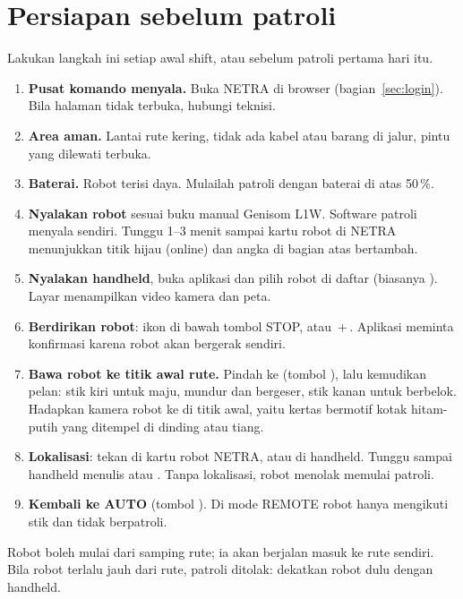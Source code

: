 \documentclass[11pt]{article}
\begin{document}
\section{Persiapan sebelum patroli}
\label{sec:prep}
Lakukan langkah ini setiap awal shift, atau sebelum patroli pertama hari itu.

\begin{enumerate}
  \item \textbf{Pusat komando menyala.} Buka NETRA di browser (bagian~\ref{sec:login}). Bila halaman
        tidak terbuka, hubungi teknisi.
  \item \textbf{Area aman.} Lantai rute kering, tidak ada kabel atau barang di jalur, pintu yang
        dilewati terbuka.
  \item \textbf{Baterai.} Robot terisi daya. Mulailah patroli dengan baterai di atas 50\,\%.
  \item \textbf{Nyalakan robot} sesuai buku manual Genisom L1W. Software patroli menyala sendiri.
        Tunggu 1--3 menit sampai kartu robot di NETRA menunjukkan titik hijau (online) dan angka
         di bagian atas bertambah.
  \item \textbf{Nyalakan handheld}, buka aplikasi  dan pilih robot di daftar
        (biasanya ). Layar menampilkan video kamera dan peta.
  \item \textbf{Berdirikan robot}: ikon  di bawah tombol STOP, atau \,+\,.
        Aplikasi meminta konfirmasi karena robot akan bergerak sendiri.
  \item \textbf{Bawa robot ke titik awal rute.} Pindah ke  (tombol ), lalu
        kemudikan pelan: stik kiri untuk maju, mundur dan bergeser, stik kanan untuk berbelok.
        Hadapkan kamera robot ke  di titik awal, yaitu kertas bermotif kotak hitam-putih
        yang ditempel di dinding atau tiang.
  \item \textbf{Lokalisasi}: tekan  di kartu robot NETRA, atau  di handheld.
        Tunggu sampai handheld menulis  atau . Tanpa lokalisasi, robot
        menolak memulai patroli.
  \item \textbf{Kembali ke AUTO} (tombol ). Di mode REMOTE robot hanya mengikuti stik dan
        tidak berpatroli.
\end{enumerate}

\begin{tips}
Robot boleh mulai dari samping rute; ia akan berjalan masuk ke rute sendiri. Bila robot terlalu jauh
dari rute, patroli ditolak: dekatkan robot dulu dengan handheld.
\end{tips}
\end{document}

